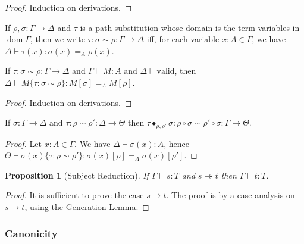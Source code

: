 \documentclass[a4paper,UKenglish]{lipics-v2016}
\newcommand*{\vald}{\ensuremath{\vdash \mathrm{valid}}}
\newcommand*{\dom}{\ensuremath{\operatorname{dom}}}
\theoremstyle{plain}
\newtheorem{proposition}[theorem]{Proposition}
\begin{document}
\begin{proof}
Induction on derivations.
\end{proof}

\begin{definition}
If $\rho, \sigma : \Gamma \rightarrow \Delta$ and $\tau$ is a path substitution whose domain
is the term variables in $\dom \Gamma$, then we write
$\tau : \sigma \sim \rho : \Gamma \rightarrow \Delta$ iff, for each variable $x : A \in \Gamma$, we have
$\Delta \vdash \tau(x) : \sigma(x) =_A \rho(x)$.
\end{definition}

\begin{lemma}
\label{lm:pathsub}
If $\tau : \sigma \sim \rho : \Gamma \rightarrow \Delta$ and $\Gamma \vdash M : A$ and $\Delta \vald$,
then $\Delta \vdash M \{ \tau : \sigma \sim \rho \} : M [ \sigma ] =_A M [ \rho ]$.
\end{lemma}

\begin{proof}
Induction on derivations.
\end{proof}

\begin{lemma}
\label{lm:pathsubcomp}
If $\sigma : \Gamma \rightarrow \Delta$ and $\tau : \rho \sim \rho' : \Delta \rightarrow \Theta$ then $\tau \bullet_{\rho, \rho'} \sigma : \rho \circ \sigma \sim \rho' \circ \sigma : \Gamma \rightarrow \Theta$.
\end{lemma}

\begin{proof}
Let $x : A \in \Gamma$.
We have $\Delta \vdash \sigma(x) : A$, hence $\Theta \vdash \sigma(x) \{ \tau : \rho \sim \rho' \} : \sigma(x) [ \rho ] =_A \sigma(x) [ \rho' ]$.
\end{proof}

\begin{proposition}[Subject Reduction]
If $\Gamma \vdash s : T$ and $s \twoheadrightarrow t$ then $\Gamma \vdash t : T$.
\end{proposition}

\begin{proof}
It is sufficient to prove the case $s \rightarrow t$.  The proof is by a case analysis on $s \rightarrow t$, using the Generation Lemma.
\end{proof}

\subsubsection{Canonicity}
\end{document}
